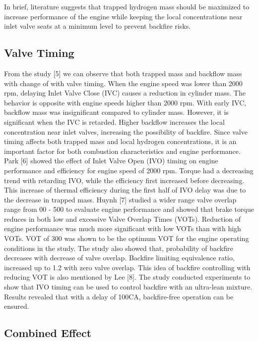 \documentclass[conference]{IEEEtran}
\begin{document}
In brief, literature suggests that trapped hydrogen mass should be maximized to increase performance of the engine while keeping the local concentrations near inlet valve seats at a minimum level to prevent backfire risks.

    
\subsection{Valve Timing}

From the study [5] we can observe that both trapped mass and backflow mass with change of with valve timing. When the engine speed was lower than 2000 rpm, delaying Inlet Valve Close (IVC) causes a reduction in cylinder mass. The behavior is opposite with engine speeds higher than 2000 rpm. With early IVC, backflow mass was insignificant compared to cylinder mass. However, it is significant when the IVC is retarded. Higher backflow increases the local concentration near inlet valves, increasing the possibility of backfire. Since valve timing affects both trapped mass and local hydrogen concentrations, it is an important factor for both combustion characteristics and engine performance.
Park [6] showed the effect of Inlet Valve Open (IVO) timing on engine performance and efficiency for engine speed of 2000 rpm. Torque had a decreasing trend with retarding IVO, while the efficiency first increased before decreasing. This increase of thermal efficiency during the first half of IVO delay was due to the decrease in trapped mass. Huynh [7] studied a wider range valve overlap range from 00 - 500 to evaluate engine performance and showed that brake torque reduces in both low and excessive Valve Overlap Times (VOTs). Reduction of engine performance was much more significant with low VOTs than with high VOTs. VOT of 300 was shown to be the optimum VOT for the engine operating conditions in the study. The study also showed that, probability of backfire decreases with decrease of valve overlap. Backfire limiting equivalence ratio, increased up to 1.2 with zero valve overlap. This idea of backfire controlling with reducing VOT is also mentioned by Lee [8]. The study conducted experiments to show that IVO timing can be used to control backfire with an ultra-lean mixture. Results revealed that with a delay of 100CA, backfire-free operation can be ensured. 


\subsection{Combined Effect}
\end{document}

